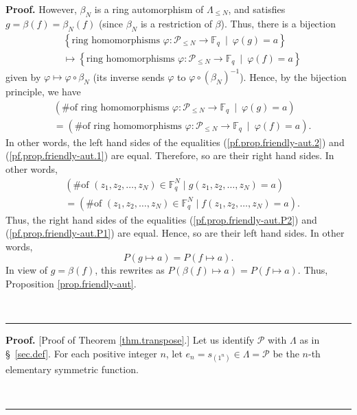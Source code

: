 \documentclass[numbers=enddot,12pt,final,onecolumn,notitlepage]{scrartcl}%
\theoremstyle{definition}
\newenvironment{proof}[1][Proof]{\noindent\textbf{#1.} }{\ \rule{0.5em}{0.5em}}
\newenvironment{verlong}{}{}
\newcommand{\Fq}{\mathbb{F}_q}
\renewcommand{\leq}{\leqslant}
\theoremstyle{plainsl}
\begin{document}
\begin{verlong}
\begin{proof}
However, $\beta_{N}$ is a ring automorphism of $\Lambda_{\leq N}$, and
satisfies $g=\beta\left(  f\right)  =\beta_{N}\left(  f\right)  $ (since
$\beta_{N}$ is a restriction of $\beta$). Thus, there is a bijection%
\begin{align*}
& \left\{  \text{ring homomorphisms }\varphi:\mathcal{P}_{\leq N}%
\rightarrow\Fq\ \mid\ \varphi\left(  g\right)  =a\right\}  \\
& \mapsto\left\{  \text{ring homomorphisms }\varphi:\mathcal{P}_{\leq
N}\rightarrow\Fq\ \mid\ \varphi\left(  f\right)  =a\right\}
\end{align*}
given by $\varphi\mapsto\varphi\circ\beta_{N}$ (its inverse sends $\varphi$ to
$\varphi\circ\left(  \beta_{N}\right)  ^{-1}$). Hence, by the bijection
principle, we have%
\begin{align*}
& \left(  \text{\# of ring homomorphisms }\varphi:\mathcal{P}_{\leq
N}\rightarrow\Fq\ \mid\ \varphi\left(  g\right)  =a\right)  \\
& =\left(  \text{\# of ring homomorphisms }\varphi:\mathcal{P}_{\leq
N}\rightarrow\Fq\ \mid\ \varphi\left(  f\right)  =a\right)  .
\end{align*}
In other words, the left hand sides of the equalities
(\ref{pf.prop.friendly-aut.2}) and (\ref{pf.prop.friendly-aut.1}) are equal.
Therefore, so are their right hand sides. In other words,%
\begin{align*}
& \left(  \text{\# of }\left(  z_{1},z_{2},\ldots,z_{N}\right)  \in
\Fq^{N}\mid g\left(  z_{1},z_{2},\ldots,z_{N}\right)  =a\right)
\\
& =\left(  \text{\# of }\left(  z_{1},z_{2},\ldots,z_{N}\right)  \in
\Fq^{N}\mid f\left(  z_{1},z_{2},\ldots,z_{N}\right)  =a\right)  .
\end{align*}
Thus, the right hand sides of the equalities (\ref{pf.prop.friendly-aut.P2})
and (\ref{pf.prop.friendly-aut.P1}) are equal. Hence, so are their left hand
sides. In other words,%
\[
P\left(  g\mapsto a\right)  =P\left(  f\mapsto a\right)  .
\]
In view of $g=\beta\left(  f\right)  $, this rewrites as $P\left(
\beta\left(  f\right)  \mapsto a\right)  =P\left(  f\mapsto a\right)  $. Thus,
Proposition \ref{prop.friendly-aut}.


\end{proof}



\begin{proof}
[Proof of Theorem \ref{thm.transpose}.] Let us identify $\mathcal{P}$ with
$\Lambda$ as in \S \ \ref{sec.def}. For each positive integer $n$, let
$e_{n}=s_{\left(  1^{n}\right)  }\in\Lambda=\mathcal{P}$ be the $n$-th
elementary symmetric function.


\end{proof}
\end{verlong}
\end{document}
